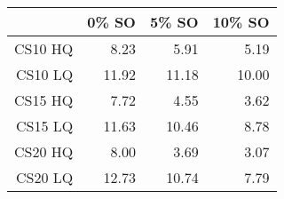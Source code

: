 \begin{table}[ht]
\begin{center}
\begin{tabular}{rrrr}
  \hline
 & 0\% SO & 5\% SO & 10\% SO \\
  \hline
CS10 HQ & 8.23 & 5.91 & 5.19 \\
  CS10 LQ & 11.92 & 11.18 & 10.00 \\
  CS15 HQ & 7.72 & 4.55 & 3.62 \\
  CS15 LQ & 11.63 & 10.46 & 8.78 \\
  CS20 HQ & 8.00 & 3.69 & 3.07 \\
  CS20 LQ & 12.73 & 10.74 & 7.79 \\
   \hline
\end{tabular}
\end{center}
\end{table}
